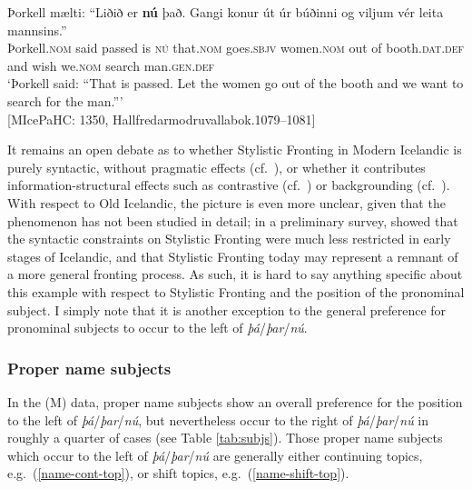\documentclass[output=paper,colorlinks,citecolor=brown]{langscibook}
\begin{document}
\ea \label{pro-subj-sf}
    \gll Þorkell mælti: ``Liðið er \textbf{nú} það. Gangi konur út úr búðinni og viljum vér leita mannsins.'' \\
    Þorkell.\textsc{nom} said passed is \textsc{nú} that.\textsc{nom} goes.\textsc{sbjv} women.\textsc{nom} out of booth.\textsc{dat.def} and wish we.\textsc{nom} search man.\textsc{gen.def}\\
    \glt `Þorkell said: ``That is passed. Let the women go out of the booth and we want to search for the man.'''\\ \hfill [MIcePaHC: 1350, Hallfredarmodruvallabok.1079--1081]
\z 

\noindent It remains an open debate as to whether Stylistic Fronting in Modern Icelandic is purely syntactic, without pragmatic effects (cf.~\citealp{Maling1990,holmberg2000scandinavian}), or whether it contributes information-structural effects such as contrastive  (cf.~\citealp{hrafnbjargarson2004stylistic}) or backgrounding (cf.~\citealp{egerland2013fronting}). With respect to Old Icelandic, the picture is even more unclear, given that the phenomenon has not been studied in detail; in a preliminary survey, \citet[chapter 4]{booth2018} showed that the syntactic constraints on Stylistic Fronting were much less restricted in early stages of Icelandic, and that Stylistic Fronting today may represent a remnant of a more general fronting process. As such, it is hard to say anything specific about this example with respect to Stylistic Fronting and the position of the pronominal subject. I simply note that it is another exception to the general preference for pronominal subjects to occur to the left of \textit{þá}/\textit{þar}/\textit{nú}.

\subsubsection{Proper name subjects}

In the (M) data, proper name subjects show an overall preference for the position to the left of \textit{þá}/\textit{þar}/\textit{nú}, but nevertheless occur to the right of \textit{þá}/\textit{þar}/\textit{nú} in roughly a quarter of cases (see Table \ref{tab:subjs}). 
Those proper name subjects which occur to the left of \textit{þá}/\textit{þar}/\textit{nú} are generally either continuing topics, e.g.~(\ref{name-cont-top}), or shift topics, e.g.~(\ref{name-shift-top}).
\end{document}
